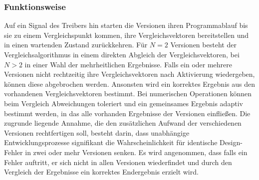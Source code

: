 \subsubsection{Funktionsweise}

Auf ein Signal des Treibers hin starten die Versionen ihren Programmablauf bis sie zu einem Vergleichspunkt kommen, ihre Vergleichsvektoren bereitstellen und in einen wartenden Zustand zurückkehren.
Für $N = 2$ Versionen besteht der Vergleichsalgorithmus in einem direkten Abgleich der Vergleichsvektoren, bei $N > 2$ in einer Wahl der mehrheitlichen Ergebnisse. Falls ein oder mehrere Versionen nicht rechtzeitig ihre Vergleichsvektoren nach Aktivierung wiedergeben, können diese abgebrochen werden. Ansonsten wird ein korrektes Ergebnis aus den vorhandenen Vergleichsvektoren bestimmt. Bei numerischen Operationen können beim Vergleich Abweichungen toleriert und ein gemeinsames Ergebnis adaptiv bestimmt werden, in das alle vorhanden Ergebnisse der Versionen einfließen. 
Die zugrunde liegende Annahme, die den zusätzlichen Aufwand der verschiedenen Versionen rechtfertigen soll, besteht darin, dass unabhängige Entwicklungsprozesse signifikant die Wahrscheinlichkeit für identische Design-Fehler in zwei oder mehr Versionen senken.
Es wird angenommen, dass falls ein Fehler auftritt, er sich nicht in allen Versionen wiederfindet und durch den Vergleich der Ergebnisse ein korrektes Endergebnis erzielt wird.



